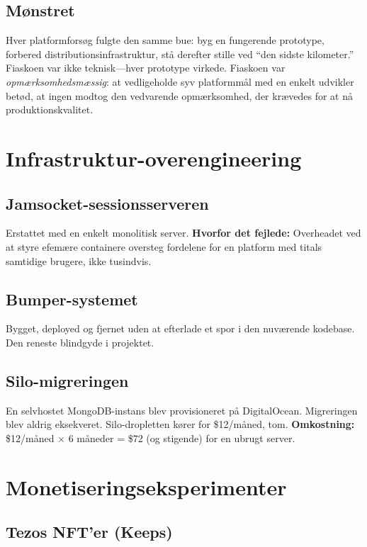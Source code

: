 \documentclass[10pt,letterpaper,twocolumn]{article}
\begin{document}
\subsection{Mønstret}

Hver platformforsøg fulgte den samme bue: byg en fungerende prototype, forbered distributionsinfrastruktur, stå derefter stille ved ``den sidste kilometer.'' Fiaskoen var ikke teknisk---hver prototype virkede. Fiaskoen var \emph{opmærksomhedsmæssig}: at vedligeholde syv platformmål med en enkelt udvikler betød, at ingen modtog den vedvarende opmærksomhed, der krævedes for at nå produktionskvalitet.

\section{Infrastruktur-overengineering}

\subsection{Jamsocket-sessionsserveren}

Erstattet med en enkelt monolitisk server. \textbf{Hvorfor det fejlede:} Overheadet ved at styre efemære containere oversteg fordelene for en platform med titals samtidige brugere, ikke tusindvis.

\subsection{Bumper-systemet}

Bygget, deployed og fjernet uden at efterlade et spor i den nuværende kodebase. Den reneste blindgyde i projektet.

\subsection{Silo-migreringen}

En selvhostet MongoDB-instans blev provisioneret på DigitalOcean. Migreringen blev aldrig eksekveret. Silo-dropletten kører for \$12/måned, tom. \textbf{Omkostning:} \$12/måned $\times$ 6 måneder = \$72 (og stigende) for en ubrugt server.

\section{Monetiseringseksperimenter}

\subsection{Tezos NFT'er (Keeps)}
\end{document}
